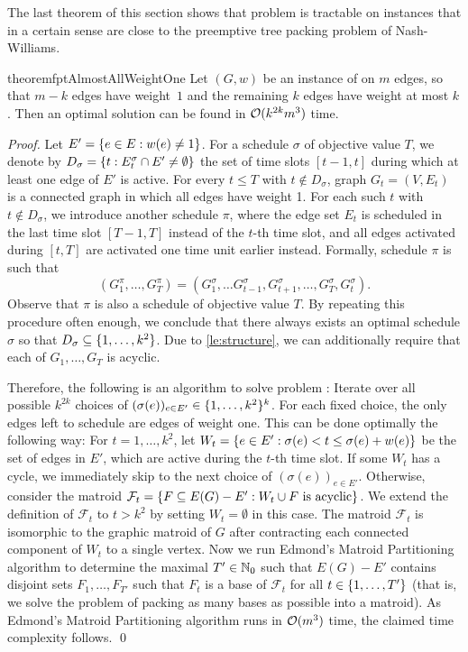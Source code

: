 The last theorem of this section shows that problem {\xxxNTP} is tractable on instances that in 
a certain sense are close to the preemptive tree packing problem of Nash-Williams. 
\begin{restatable}{theorem}{fptAlmostAllWeightOne}
\label{th:fpt_almost_all_weight_one}
Let $(G,w)$ be an instance of {\xxxNTP} on $m$ edges, so that $m-k$ edges have weight~$1$ and 
the remaining $k$ edges have weight at most $k$. 
Then an optimal solution can be found in $\mathcal{O}(k^{2k}m^3)$ time.
\end{restatable}
\begin{proof}
Let $E'=\{ e\in E: w(e)\ne1 \}$. 
For a schedule $\sigma$ of objective value $T$, we denote by $D_\sigma= \{ t: E_t^\sigma\cap E'\ne\emptyset \}$ 
the set of time slots $[t-1,t]$ during which at least one edge of $E'$ is active. 
For every $t\le T$ with $t\notin D_\sigma$, graph $G_t=(V,E_t)$ is a connected graph in which 
all edges have weight 1.  
For each such $t$ with $t \not\in D_\sigma$, we introduce another schedule $\pi$, where the edge set $E_t$ is scheduled in the last time 
slot $[T-1, T]$ instead of the $t$-th time slot, and all edges activated during $[t, T]$ are activated 
one time unit earlier instead. Formally, schedule $\pi$ is such that
\[(G^\pi_1,\dots, G^\pi_T) = (G^\sigma_1, \dots G^\sigma_{t-1}, G^\sigma_{t+1}, \dots, G^\sigma_T, G^\sigma_t). \]
Observe that $\pi$ is also a schedule of objective value $T$. 
By repeating this procedure often enough, we conclude that there always exists an optimal schedule $\sigma$ so that $D_\sigma \subseteq \{ 1, \ldots, k^2 \}$. 
Due to \cref{le:structure}, we can additionally require that each of $G_1, \dots, G_T$ is acyclic.

Therefore, the following is an algorithm to solve problem {\xxxNTP}: 
Iterate over all possible $k^{2k}$ choices of $(\sigma(e))_{e \in E'} \in \{ 1, \ldots, k^2 \}^k$. 
For each fixed choice, the only edges left to schedule are edges of weight one. 
This can be done optimally the following way: 
For $t = 1,\dots, k^2$, let $W_t = \{ e \in E' : \sigma(e) < t \leq \sigma(e) + w(e) \}$ be the set of edges in $E'$, which are active during the $t$-th time slot. 
If some $W_t$ has a cycle, we immediately skip to the next choice of $(\sigma(e))_{e \in E'}$. 
Otherwise, consider the matroid $\mathcal{F}_t = \{ F \subseteq E(G)-E' : W_t \cup F \text{ is acyclic} \}$. 
We extend the definition of $\mathcal{F}_t$ to $t > k^2$ by setting $W_t = \emptyset$ in this case. 
The matroid $\mathcal{F}_t$ is isomorphic to the graphic matroid of $G$ after contracting each connected 
component of $W_t$ to a single vertex. 
Now we run Edmond's Matroid Partitioning algorithm \cite{edmonds1965minimum} to determine the 
maximal $T'\in\mathbb{N}_0$ such that $E(G)-E'$ contains disjoint sets $F_1, \dots, F_{T'}$ such that $F_t$ 
is a base of $\mathcal{F}_t$ for all $t \in \{ 1, \ldots, T' \}$ (that is, we solve the problem of packing as 
many bases as possible into a matroid). 
As Edmond's Matroid Partitioning algorithm runs in $\mathcal{O}(m^3)$ time, the claimed time complexity follows.
\qed
\end{proof}


